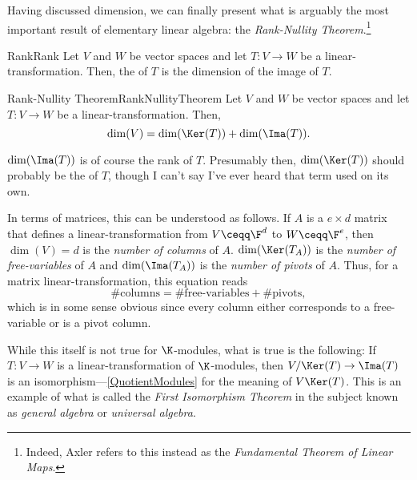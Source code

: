 Having discussed dimension, we can finally present what is arguably the most important result of elementary linear algebra:  the \emph{Rank-Nullity Theorem}.\footnote{Indeed, Axler \cite{Axler} refers to this instead as the \emph{Fundamental Theorem of Linear Maps}.}
\begin{dfn}{Rank}{Rank}
	Let $V$ and $W$ be vector spaces and let $T\colon V\rightarrow W$ be a linear-transformation.  Then, the  of $T$ is the dimension of the image of $T$.
\end{dfn}
\begin{thm}{Rank-Nullity Theorem}{RankNullityTheorem}
	Let $V$ and $W$ be vector spaces and let $T\colon V\rightarrow W$ be a linear-transformation.  Then,
	\begin{equation}
		\dim (V)=\dim (\Ker (T))+\dim (\Ima (T)).
	\end{equation}
	\begin{rmk}
		$\dim (\Ima (T))$ is of course the rank of $T$.  Presumably then, $\dim (\Ker (T))$ should probably be the  of $T$, though I can't say I've ever heard that term used on its own.
	\end{rmk}
	\begin{rmk}
		In terms of matrices, this can be understood as follows.  If $A$ is a $e\times d$ matrix that defines a linear-transformation from $V\ceqq \F ^d$ to $W\ceqq \F ^e$, then $\dim (V)=d$ is the \emph{number of columns} of $A$.  $\dim (\Ker (T_A))$ is the \emph{number of free-variables} of $A$ and $\dim (\Ima (T_A))$ is the \emph{number of pivots} of $A$.  Thus, for a matrix linear-transformation, this equation reads
		\begin{equation}
			\text{\# columns}=\text{\# free-variables}+\text{\# pivots},
		\end{equation}
		which is in some sense obvious since every column either corresponds to a free-variable or is a pivot column.
	\end{rmk}
	\begin{rmk}
		While this itself is not true for $\K$-modules, what is true is the following:  If $T\colon V\rightarrow W$ is a linear-transformation of $\K$-modules, then $V/\Ker (T)\rightarrow \Ima (T)$ is an isomorphism---\cref{QuotientModules} for the meaning of $V\Ker (T)$.  This is an example of what is called the \emph{First Isomorphism Theorem} in the subject known as \emph{general algebra} or \emph{universal algebra}.
	\end{rmk}

\end{thm}
